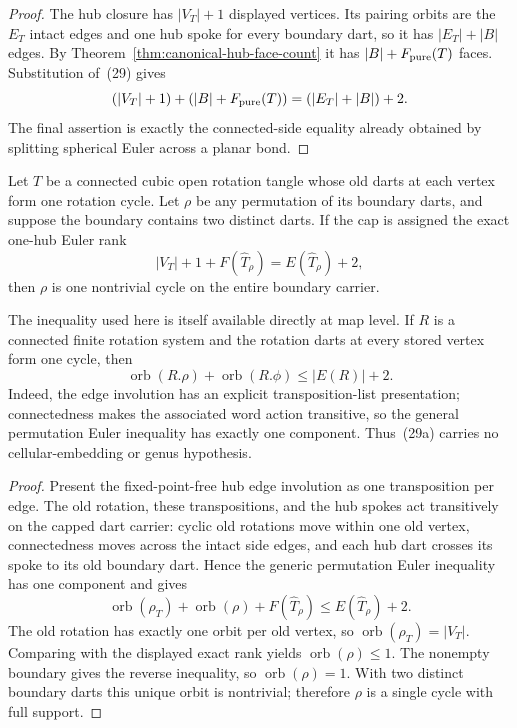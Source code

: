 \begin{proof}
The hub closure has \(|V_T|+1\) displayed vertices.  Its pairing orbits are
the \(E_T\) intact edges and one hub spoke for every boundary dart, so it has
\(|E_T|+|B|\) edges.  By Theorem~\ref{thm:canonical-hub-face-count} it has
\(|B|+F_{\rm pure}(T)\) faces.  Substitution of~(29) gives
\[
 (|V_T|+1)+(|B|+F_{\rm pure}(T))
      =(|E_T|+|B|)+2.
\]
The final assertion is exactly the connected-side equality already obtained
by splitting spherical Euler across a planar bond.
\end{proof}

\begin{theorem}
\label{thm:exact-rank-forces-one-hub}
Let \(T\) be a connected cubic open rotation tangle whose old darts at each
vertex form one rotation cycle.  Let \(\rho\) be any permutation of its
boundary darts, and suppose the boundary contains two distinct darts.  If
the cap is assigned the exact one-hub Euler rank
\[
       |V_T|+1+F(\widehat T_\rho)=E(\widehat T_\rho)+2,
\]
then \(\rho\) is one nontrivial cycle on the entire boundary carrier.
\end{theorem}

The inequality used here is itself available directly at map level.  If
\(R\) is a connected finite rotation system and the rotation darts at every
stored vertex form one cycle, then
\[
       \operatorname{orb}(R.\rho)+\operatorname{orb}(R.\phi)
          \le |E(R)|+2.                                  \tag{29a}
\]
Indeed, the edge involution has an explicit transposition-list presentation;
connectedness makes the associated word action transitive, so the general
permutation Euler inequality has exactly one component.  Thus~(29a) carries
no cellular-embedding or genus hypothesis.

\begin{proof}
Present the fixed-point-free hub edge involution as one transposition per
edge.  The old rotation, these transpositions, and the hub spokes act
transitively on the capped dart carrier: cyclic old rotations move within
one old vertex, connectedness moves across the intact side edges, and each
hub dart crosses its spoke to its old boundary dart.  Hence the generic
permutation Euler inequality has one component and gives
\[
 \operatorname{orb}(\rho_T)+\operatorname{orb}(\rho)
       +F(\widehat T_\rho)
       \le E(\widehat T_\rho)+2.
\]
The old rotation has exactly one orbit per old vertex, so
\(\operatorname{orb}(\rho_T)=|V_T|\).  Comparing with the displayed exact
rank yields
\(\operatorname{orb}(\rho)\le1\).  The nonempty boundary gives the reverse
inequality, so \(\operatorname{orb}(\rho)=1\).  With two distinct boundary
darts this unique orbit is nontrivial; therefore \(\rho\) is a single cycle
with full support.
\end{proof}

